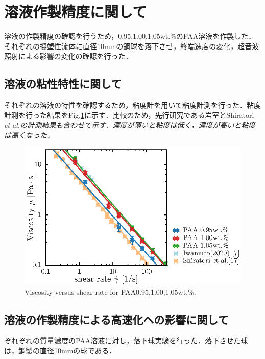 \section{溶液作製精度に関して}

溶液の作製精度の確認を行うため，0.95,1.00,1.05wt.\%のPAA溶液を作製した．それぞれの擬塑性流体に直径10mmの鋼球を落下させ，終端速度の変化，超音波照射による影響の変化の確認を行った．

\subsection{溶液の粘性特性に関して}
それぞれの溶液の特性を確認するため，粘度計を用いて粘度計測を行った．粘度計測を行った結果をFig.\ref{fig:95-105}に示す．比較のため，先行研究である岩室\cite{ref:8}とShiratori \it{et al}.\cite{ref:9}の計測結果も合わせて示す．濃度が薄いと粘度は低く，濃度が高いと粘度は高くなった．


\begin{figure}[ht]
    \includegraphics[width=1\textwidth]{X-Appendix/concentration/viscosity/viscosity.eps}
    \caption{Viscosity versus shear rate for PAA0.95,1.00,1.05wt.\%.}
    \label{fig:95-105}
\end{figure}

\subsection{溶液の作製精度による高速化への影響に関して}

ぞれぞれの質量濃度のPAA溶液に対し，落下球実験を行った．落下させた球は，鋼製の直径10mmの球である．
